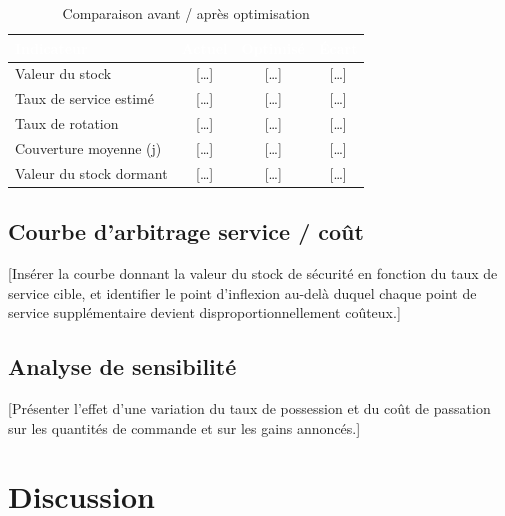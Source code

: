 \begin{table}[H]
  \centering
  \caption{Comparaison avant / après optimisation}
  \label{tab:comparaison}
  \renewcommand{\arraystretch}{1.4}
  \begin{tabularx}{\textwidth}{|X|c|c|c|}
    \hline
    \rowcolor{iacsTableHead}
    \textcolor{white}{\textbf{Indicateur}} &
    \textcolor{white}{\textbf{Actuel}} &
    \textcolor{white}{\textbf{Optimisé}} &
    \textcolor{white}{\textbf{Écart}} \\
    \hline
    Valeur du stock          & [\ldots] & [\ldots] & [\ldots] \\
    \hline
    \rowcolor{iacsLightGray}
    Taux de service estimé   & [\ldots] & [\ldots] & [\ldots] \\
    \hline
    Taux de rotation         & [\ldots] & [\ldots] & [\ldots] \\
    \hline
    \rowcolor{iacsLightGray}
    Couverture moyenne (j)   & [\ldots] & [\ldots] & [\ldots] \\
    \hline
    Valeur du stock dormant  & [\ldots] & [\ldots] & [\ldots] \\
    \hline
  \end{tabularx}
\end{table}

\subsection{Courbe d'arbitrage service / coût}

\hspace{1cm}[Insérer la courbe donnant la valeur du stock de sécurité en
fonction du taux de service cible, et identifier le point d'inflexion au-delà
duquel chaque point de service supplémentaire devient disproportionnellement
coûteux.]

\subsection{Analyse de sensibilité}

\hspace{1cm}[Présenter l'effet d'une variation du taux de possession et du coût
de passation sur les quantités de commande et sur les gains annoncés.]

\section{Discussion}
\label{sec:discussion}

